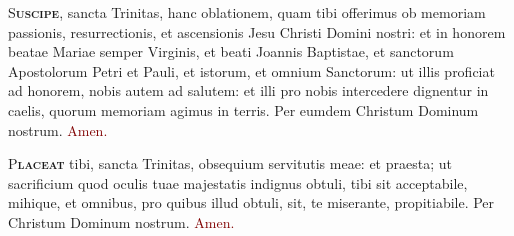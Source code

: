 \documentclass[12pt,a3paper, landscape]{scrartcl}
\newcommand{\amen}{\textcolor{Maroon}{Amen.}}
\newcommand{\initial}[2]{\lettrine[lines=3]{\color{Maroon}#1}{\bfseries\color{Maroon}#2}}
\newcommand{\gap}{\vspace*{0.1cm}}
\begin{document}
\begin{center}
\begin{minipage}[t]{0.28\linewidth}
        \gap

        \initial{S}{uscipe}, sancta Trinitas, hanc oblationem, quam tibi
        offerimus ob memoriam passionis, resurrectionis, et ascensionis Jesu
        Christi Domini nostri: et in honorem beatae Mariae semper Virginis, et
        beati Joannis Baptistae, et sanctorum Apostolorum Petri et Pauli, et
        istorum, et omnium Sanctorum: ut illis proficiat ad honorem, nobis autem
        ad salutem: et illi pro nobis intercedere dignentur in caelis, quorum
        memoriam agimus in terris. Per eumdem Christum Dominum nostrum. \amen

        \gap

        \initial{P}{laceat} tibi, sancta Trinitas, obsequium servitutis meae: et
        praesta; ut sacrificium quod oculis tuae majestatis indignus obtuli,
        tibi sit acceptabile, mihique, et omnibus, pro quibus illud obtuli, sit,
        te miserante, propitiabile. Per Christum Dominum nostrum. \amen

    \end{minipage}
\end{center}

\end{document}
